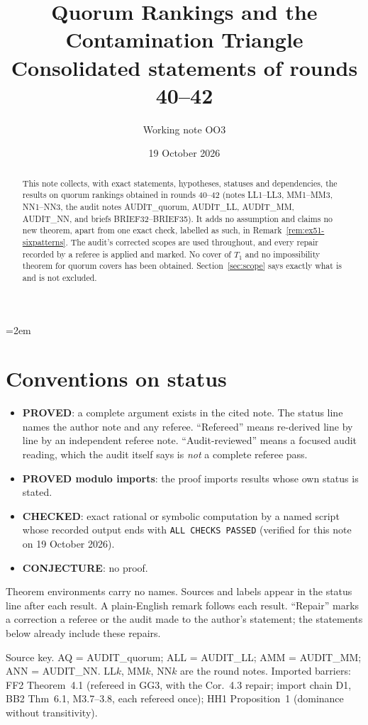\documentclass[11pt]{article}
\title{Quorum Rankings and the Contamination Triangle\\[2pt]
\large Consolidated statements of rounds 40--42}
\author{Working note OO3}
\date{19 October 2026}
\theoremstyle{definition}
\theoremstyle{remark}
\newcommand{\src}[1]{\textsf{#1}}
\begin{document}
\emergencystretch=2em
\maketitle

\begin{abstract}
This note collects, with exact statements, hypotheses, statuses and dependencies, the results on quorum rankings obtained in rounds 40--42 (notes LL1--LL3, MM1--MM3, NN1--NN3, the audit notes AUDIT\_quorum, AUDIT\_LL, AUDIT\_MM, AUDIT\_NN, and briefs BRIEF32--BRIEF35). It adds no assumption and claims no new theorem, apart from one exact check, labelled as such, in Remark~\ref{rem:ex51-sixpatterns}. The audit's corrected scopes are used throughout, and every repair recorded by a referee is applied and marked. No cover of $T_1$ and no impossibility theorem for quorum covers has been obtained. Section~\ref{sec:scope} says exactly what is and is not excluded.
\end{abstract}

\tableofcontents

\section*{Conventions on status}
\begin{itemize}[leftmargin=*]
\item \textbf{PROVED}: a complete argument exists in the cited note. The status line names the author note and any referee. ``Refereed'' means re-derived line by line by an independent referee note. ``Audit-reviewed'' means a focused audit reading, which the audit itself says is \emph{not} a complete referee pass.
\item \textbf{PROVED modulo imports}: the proof imports results whose own status is stated.
\item \textbf{CHECKED}: exact rational or symbolic computation by a named script whose recorded output ends with \texttt{ALL CHECKS PASSED} (verified for this note on 19 October 2026).
\item \textbf{CONJECTURE}: no proof.
\end{itemize}
Theorem environments carry no names. Sources and labels appear in the status line after each result. A plain-English remark follows each result. ``Repair'' marks a correction a referee or the audit made to the author's statement; the statements below already include these repairs.

Source key. \src{AQ} = AUDIT\_quorum; \src{ALL} = AUDIT\_LL; \src{AMM} = AUDIT\_MM; \src{ANN} = AUDIT\_NN. LL$k$, MM$k$, NN$k$ are the round notes. Imported barriers: \src{FF2} Theorem~4.1 (refereed in GG3, with the Cor.~4.3 repair; import chain D1, BB2 Thm~6.1, M3.7--3.8, each refereed once); \src{HH1} Proposition~1 (dominance without transitivity).
\end{document}
